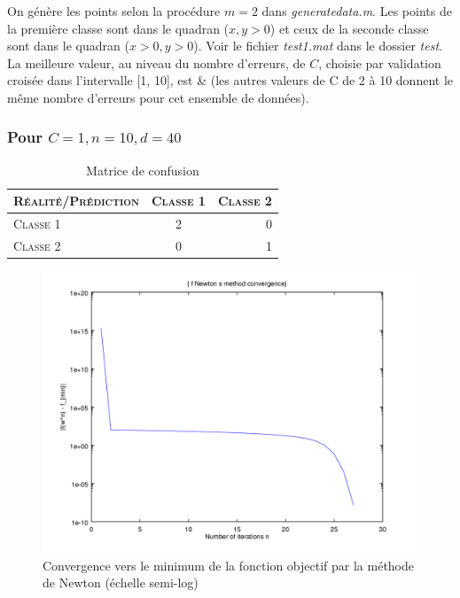 \documentclass{article}
\begin{document}
On génère les points selon la procédure $m = 2$ dans \emph{generatedata.m}. Les points de la première classe sont dans le quadran ($x, y > 0$) et ceux de la seconde classe sont dans le quadran ($x > 0, y > 0$). Voir le fichier \emph{test1.mat} dans le dossier \emph{test}. La meilleure valeur, au niveau du nombre d'erreurs, de $C$, choisie par validation croisée dans l'intervalle [1, 10], est & (les autres valeurs de C de 2 à 10 donnent le même nombre d'erreurs pour cet ensemble de données).

\subsubsection{Pour $C=1, n=10, d=40$}

     \begin{table}[H]
       \caption{Matrice de confusion}
       \begin{tabular}{|l|c|r|}
         \hline
         \textsc{Réalité/Prédiction} & \textsc{Classe 1} & \textsc{Classe 2}\\
         \hline
         \textsc{Classe 1} & 2 & 0\\
         \hline
         \textsc{Classe 2} & 0 & 1\\
         \hline
       \end{tabular}
     \end{table}

         \begin{figure}
           \begin{center}
             \subfigure\includegraphics[scale=0.5]{images/cvnewton1.png}
             \caption{Convergence vers le minimum de la fonction objectif par la méthode de Newton (échelle semi-log)}
           \end{center}
         \end{figure}
\end{document}
